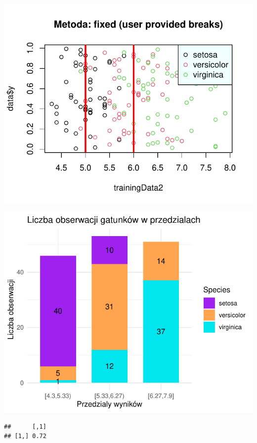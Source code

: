 \documentclass[
  12pt,
]{article}
\begin{document}
\begin{center}\includegraphics{Sprawozdanie2_files/figure-latex/givenRanges_najg-2} \end{center}

\begin{center}\includegraphics{Sprawozdanie2_files/figure-latex/tabela_kondygnacji_4_najg-1} \end{center}

\begin{verbatim}
##      [,1]
## [1,] 0.72
\end{verbatim}
\end{document}

